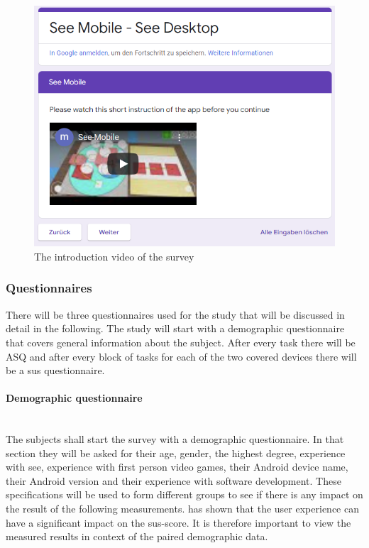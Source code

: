 \begin{figure}[H]
  \centering
  \includegraphics[width=1\textwidth]{Evaluation/img/form_video.png}
  \caption{The introduction video of the survey}\label{fig:video}
\end{figure}

\subsubsection{Questionnaires}
\label{questionaires}
There will be three questionnaires used for the study that will be discussed in detail in the following.
The study will start with a demographic questionnaire that covers general information about the subject.
After every task there will be \gls{ASQ} and after every block of tasks for each of the two covered devices there will be a \gls{sus} questionnaire.
\paragraph{Demographic questionnaire}\mbox{}\\
The subjects shall start the survey with a demographic questionnaire.
In that section they will be asked for their age, gender, the highest degree, experience with \gls{see}, experience with first person video games, their Android device name, their Android version and their experience with software development.
These specifications will be used to form different groups to see if there is any impact on the result of the following measurements. 
\cite{Mclellan2011} has shown that the user experience can have a significant impact on the \gls{sus}-score.
It is therefore important to view the measured results in context of the paired demographic data.

